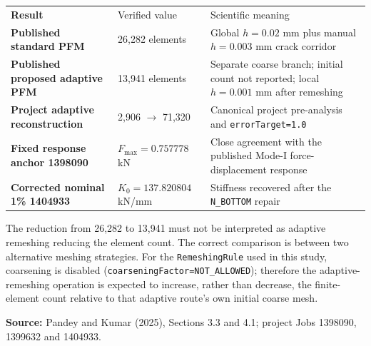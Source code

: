 \documentclass[10pt,a4paper]{article}
\newcommand{\rowcolor}[1]{}
\newcommand{\headrow}{\color{navy}\bfseries}
\newcommand{\src}[1]{\par{\footnotesize\color{graytext}\textbf{Source:} #1}}
\begin{document}
\small
\par\smallskip\noindent
\begin{tabularx}{\textwidth}{>{\bfseries}p{37mm}p{38mm}Y}
\headrow Result & Verified value & Scientific meaning\\
Published standard PFM & 26,282 elements & Global $h=0.02$ mm plus manual $h=0.003$ mm crack corridor\\
\rowcolor{paleblue}Published proposed adaptive PFM & 13,941 elements & Separate coarse branch; initial count not reported; local $h=0.001$ mm after remeshing\\
Project adaptive reconstruction & 2,906 $\rightarrow$ 71,320 & Canonical project pre-analysis and \texttt{errorTarget=1.0}\\
\rowcolor{paleblue}Fixed response anchor 1398090 & $F_{\max}=0.757778$ kN & Close agreement with the published Mode-I force-displacement response\\
Corrected nominal 1\% 1404933 & $K_0=137.820804$ kN/mm & Stiffness recovered after the \texttt{N\_BOTTOM} repair\\
\end{tabularx}\par\smallskip
\normalsize

The reduction from 26,282 to 13,941 must not be interpreted as adaptive remeshing reducing the element count. The correct comparison is between two alternative meshing strategies. For the 
\texttt{RemeshingRule} used in this study, coarsening is disabled (\texttt{coarseningFactor=NOT\_ALLOWED}); therefore the adaptive-remeshing operation is expected to increase, rather than decrease, the finite-element count relative to that adaptive route's own initial coarse mesh.
\src{Pandey and Kumar (2025), Sections 3.3 and 4.1; project Jobs 1398090, 1399632 and 1404933.}

\newpage
\end{document}
